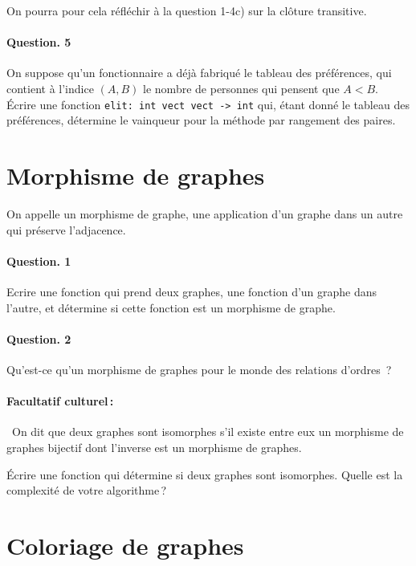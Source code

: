 \documentclass[10pt,a4paper]{article}
\begin{document}
On pourra pour cela réfléchir à la question 1-4c) sur la clôture transitive.

\paragraph{Question. 5\\}
On suppose qu'un fonctionnaire a déjà fabriqué le tableau
des préférences, qui contient à l'indice $(A,B)$ le nombre de personnes qui 
pensent que $A<B$. Écrire une fonction \texttt{elit: int vect vect -> int} qui, 
étant donné le tableau des préférences, détermine le vainqueur pour la méthode 
par rangement des paires.

\section{Morphisme de graphes}
On appelle un morphisme de graphe, une application d'un graphe dans un
autre qui préserve l'adjacence.

\paragraph{Question. 1\\} Ecrire une fonction qui prend deux graphes,
une fonction d'un graphe dans l'autre, et détermine si cette fonction est
un morphisme de graphe. 

\paragraph{Question. 2\\}
Qu'est-ce qu'un morphisme de graphes pour le monde des relations d'ordres~?

\paragraph{Facultatif culturel\,:\\} On dit que deux graphes sont isomorphes s'il 
existe entre eux un morphisme de graphes bijectif dont l'inverse est un 
morphisme de graphes.

Écrire une fonction qui détermine si deux graphes
sont isomorphes. Quelle est la complexité de votre algorithme\,?

\section{Coloriage de graphes}
\end{document}
